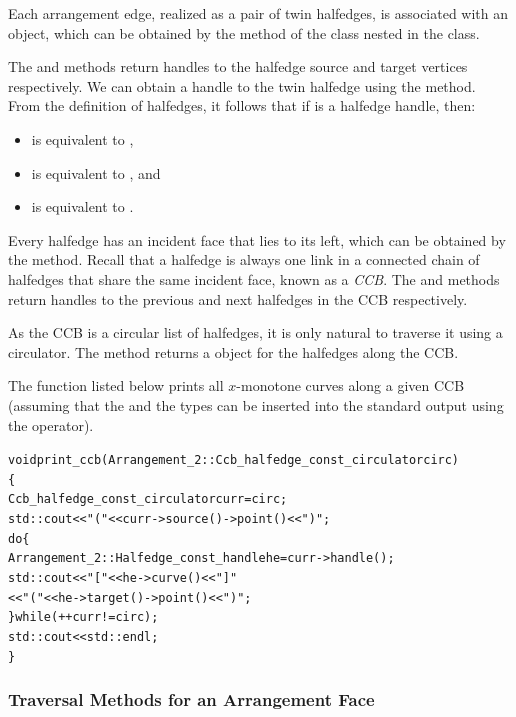 Each arrangement edge, realized as a pair of twin halfedges,
is associated with an  object, which
can be obtained by the  method of the 
class nested in the  class.

The  and  methods return handles to
the halfedge source and target vertices respectively. We can
obtain a handle to the twin halfedge using the 
method. From the definition of halfedges, it follows that if
 is a halfedge handle, then:
\begin{itemize}
\item {} is equivalent to ,
\item {} is equivalent to , and
\item {} is equivalent to .
\end{itemize}

Every halfedge has an incident face that lies to its left, which
can be obtained by the  method. Recall that a
halfedge is always one link in a connected chain of halfedges that
share the same incident face, known as a {\em CCB}. The
 and  methods return handles to the
previous and next halfedges in the CCB respectively. 

As the CCB is a circular list of halfedges, it is only natural to 
traverse it using a circulator. The  method returns a 
 object for the
halfedges along the CCB.

The function  listed below prints all $x$-monotone
curves along a given CCB (assuming that the  and the
 types can be inserted into the standard output
using the \ccc{<<} operator).
\begin{alltt}
void print_ccb (Arrangement_2::Ccb_halfedge_const_circulator circ)
\{
  Ccb_halfedge_const_circulator curr = circ;
  std::cout << "(" << curr->source()->point() << ")";
  do \{
    Arrangement_2::Halfedge_const_handle he = curr->handle();
    std::cout << "   [" << he->curve() << "]   "
              << "(" << he->target()->point() << ")";
  \} while (++curr != circ);
  std::cout << std::endl;
\}
\end{alltt}

\subsubsection{Traversal Methods for an Arrangement Face\label{arr_sssec:tr_face}}

